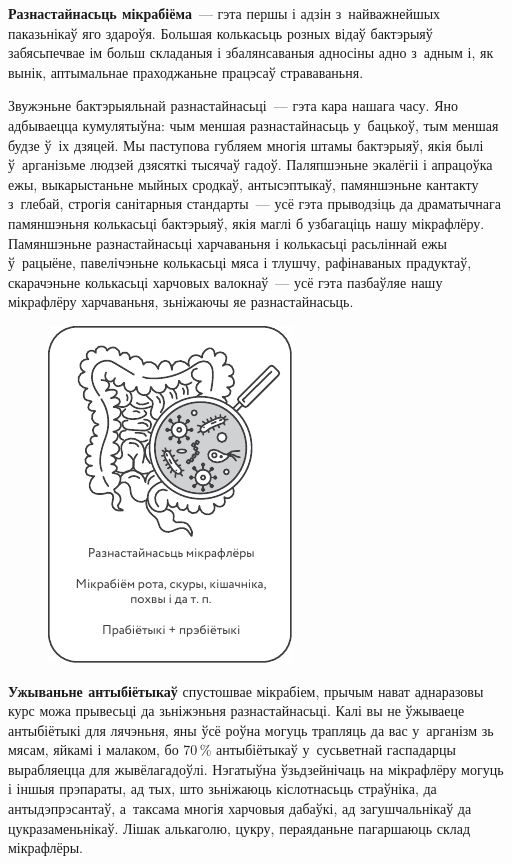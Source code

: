\textbf{Разнастайнасьць мікрабіёма}~--- гэта першы і адзін з~найважнейшых паказьнікаў яго здароўя. Большая колькасьць розных відаў бактэрыяў забясьпечвае ім больш складаныя і збалянсаваныя адносіны адно з~адным і, як вынік, аптымальнае праходжаньне працэсаў страваваньня.

Звужэньне бактэрыяльнай разнастайнасьці~--- гэта кара нашага часу. Яно адбываецца кумулятыўна: чым меншая разнастайнасьць у~бацькоў, тым меншая будзе ў~іх дзяцей. Мы паступова губляем многія штамы бактэрыяў, якія былі ў~арганізьме людзей дзясяткі тысячаў гадоў. Паляпшэньне экалёгіі і апрацоўка ежы, выкарыстаньне мыйных сродкаў, антысэптыкаў, памяншэньне кантакту з~глебай, строгія санітарныя стандарты~--- усё гэта прыводзіць да драматычнага памяншэньня колькасьці бактэрыяў, якія маглі б узбагаціць нашу мікрафлёру. Памяншэньне разнастайнасьці харчаваньня і колькасьці расьліннай ежы ў~рацыёне, павелічэньне колькасьці мяса і тлушчу, рафінаваных прадуктаў, скарачэньне колькасьці харчовых валокнаў~--- усё гэта пазбаўляе нашу мікрафлёру харчаваньня, зьніжаючы яе разнастайнасьць.


\begin{figure}[htb!]
  \centering
  \includegraphics[scale=1.5]{willpower/ch12/6.pdf}
\end{figure}

\textbf{Ужываньне антыбіётыкаў} спустошвае мікрабіем, прычым нават аднаразовы курс можа прывесьці да зьніжэньня разнастайнасьці. Калі вы не ўжываеце антыбіётыкі для лячэньня, яны ўсё роўна могуць трапляць да вас у~арганізм зь мясам, яйкамі і малаком, бо 70\,\% антыбіётыкаў у~сусьветнай гаспадарцы вырабляецца для жывёлагадоўлі. Нэгатыўна ўзьдзейнічаць на мікрафлёру могуць і іншыя прэпараты, ад тых, што зьніжаюць кіслотнасьць страўніка, да антыдэпрэсантаў, а~таксама многія харчовыя дабаўкі, ад загушчальнікаў да цукразаменьнікаў. Лішак алькаголю, цукру, пераяданьне пагаршаюць склад мікрафлёры.

